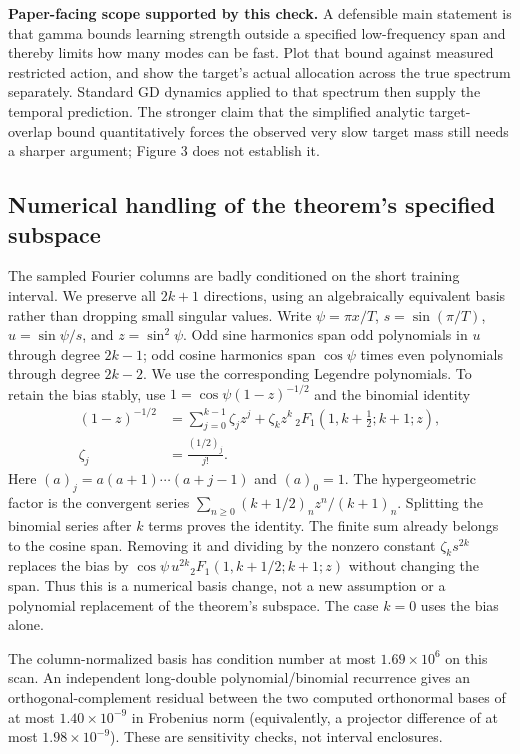 \documentclass[11pt]{article}
\theoremstyle{definition}
\begin{document}
\textbf{Paper-facing scope supported by this check.}
A defensible main statement is that gamma bounds learning strength outside a
specified low-frequency span and thereby limits how many modes can be fast.
Plot that bound against measured restricted action, and show the target's
actual allocation across the true spectrum separately. Standard GD dynamics
applied to that spectrum then supply the temporal prediction. The stronger
claim that the simplified analytic target-overlap bound quantitatively forces
the observed very slow target mass still needs a sharper argument; Figure 3
does not establish it.

\subsection*{Numerical handling of the theorem's specified subspace}
The sampled Fourier columns are badly conditioned on the short training
interval. We preserve all $2k+1$ directions, using an algebraically equivalent
basis rather than dropping small singular values. Write $\psi=\pi x/T$,
$s=\sin(\pi/T)$, $u=\sin\psi/s$, and $z=\sin^2\psi$. Odd sine harmonics
span odd polynomials in $u$ through degree $2k-1$; odd cosine harmonics span
$\cos\psi$ times even polynomials through degree $2k-2$. We use the
corresponding Legendre polynomials. To retain the bias stably, use
$1=\cos\psi(1-z)^{-1/2}$ and the binomial identity
\begin{equation*}
 \begin{split}
 (1-z)^{-1/2}
 &=\sum_{j=0}^{k-1}\zeta_jz^j
 +\zeta_kz^k\,{}_2F_1(1,k+\tfrac12;k+1;z),\\
 \zeta_j&=\frac{(1/2)_j}{j!}.
 \end{split}
\end{equation*}
Here $(a)_j=a(a+1)\cdots(a+j-1)$ and $(a)_0=1$. The hypergeometric factor
is the convergent series $\sum_{n\ge0}(k+1/2)_n z^n/(k+1)_n$. Splitting
the binomial series after $k$ terms proves the identity. The finite sum
already belongs to the cosine span. Removing it and dividing by the nonzero
constant $\zeta_ks^{2k}$ replaces the bias by
$\cos\psi\,u^{2k}{}_2F_1(1,k+1/2;k+1;z)$ without changing the span.
Thus this is a numerical basis change, not a new assumption or a polynomial
replacement of the theorem's subspace. The case $k=0$ uses the bias alone.

The column-normalized basis has condition number at most $1.69\times10^6$
on this scan. An independent long-double polynomial/binomial recurrence
gives an orthogonal-complement residual between the two computed orthonormal
bases of at most $1.40\times10^{-9}$ in Frobenius norm (equivalently, a
projector difference of at most $1.98\times10^{-9}$). These are sensitivity
checks, not interval enclosures.
\end{document}
